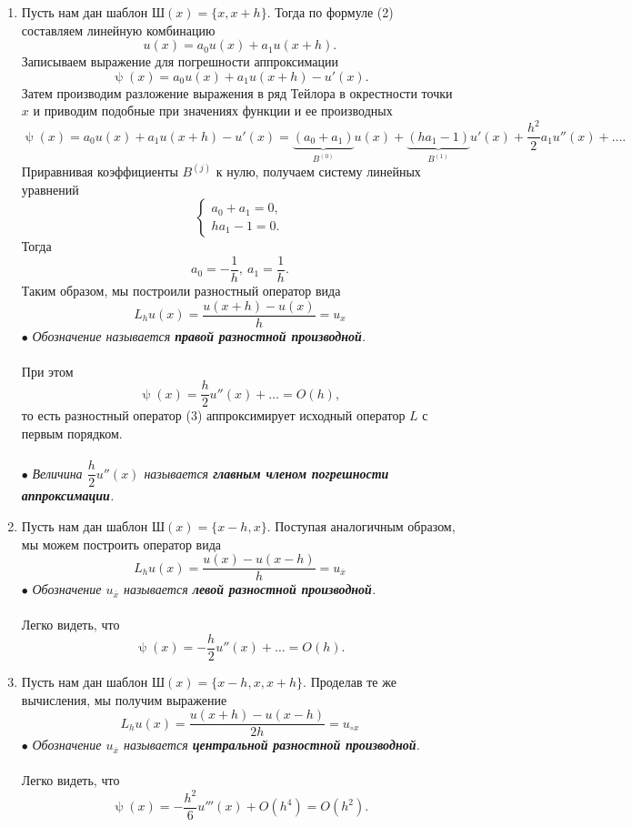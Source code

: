 \documentclass[a4paper, 12pt]{report}
\numberwithin{equation}{section}
\newcommand{\ol}{\overline}
\renewcommand{\psi}{\uppsi}
\begin{document}
\begin{enumerate}
\item Пусть нам дан шаблон $\text{Ш}(x) = \{x, x+h\}$. Тогда по формуле (2) составляем линейную комбинацию
$$u(x) = a_0 u(x) + a_1u(x+h).$$
Записываем выражение для погрешности аппроксимации
$$\psi(x)= a_0u(x) + a_1u(x+h) - u'(x).$$
Затем производим разложение выражения в ряд Тейлора в окрестности точки $x$ и приводим подобные при значениях функции и ее производных
$$\psi(x)= a_0u(x) + a_1u(x+h) - u'(x) = \underbrace{(a_0+a_1)}_{B ^{(0)}}u(x) + \underbrace{(ha_1 - 1)}_{B^{(1)}} u'(x) + \dfrac{h^2}{2} a_1 u''(x) + \ldots.$$
Приравнивая коэффициенты $B^{(j)}$ к нулю, получаем систему линейных уравнений 
$$\begin{cases}
	a_0+a_1 = 0,\\
	ha_1 - 1= 0.
\end{cases}$$
Тогда $$a_0 = -\dfrac 1h,\ a_1 = \dfrac 1h.$$
Таким образом, мы построили разностный оператор вида 
\begin{equation}
	L_hu(x) = \dfrac{u(x+h) - u(x)}{h} = u_x
\end{equation}
$\bullet$ \textit{Обозначение называется \textbf{правой разностной производной}.}\\\\
При этом $$\psi(x) = \dfrac h2 u''(x) + \ldots = O(h),$$ то есть разностный оператор (3) аппроксимирует исходный оператор $L$ с первым порядком.\\\\
$\bullet$ \textit{Величина $\dfrac h 2 u''(x)$ называется \textbf{главным членом погрешности аппроксимации}.}
\item Пусть нам дан шаблон $\text{Ш}(x) = \{x-h, x\}$. Поступая аналогичным образом, мы можем построить оператор вида 
\begin{equation}
	L_hu(x) = \dfrac{u(x) - u(x-h)}{h} = u_{\ol x}
\end{equation}
$\bullet$ \textit{Обозначение $u_{\ol x}$ называется \textbf{левой разностной производной}. }
\\\\
Легко видеть, что $$\psi(x) = -\dfrac h2 u''(x) + \ldots = O(h).$$ 
\item Пусть нам дан шаблон $\text{Ш}(x) = \{x-h, x, x+h\}$. Проделав те же вычисления, мы получим выражение 
\begin{equation}
	L_hu(x) = \dfrac{u(x+h) - u(x-h)}{2h} = u_{\circ x}
\end{equation}
$\bullet$ \textit{Обозначение $u_{\ol x}$ называется \textbf{центральной разностной производной}.}
\\\\
Легко видеть, что $$\psi(x) = -\dfrac {h^2}{6} u'''(x) + O(h^4) = O(h^2).$$ 
\end{enumerate}
\end{document}
